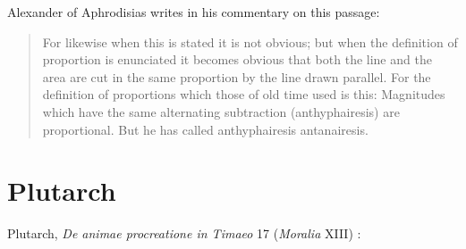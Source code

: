 \documentclass{article}
\theoremstyle{definition}
\begin{document}
Alexander of Aphrodisias \cite[p.~507]{thomasI} writes in his commentary on this passage:

\begin{quote}
For likewise when this is stated it is not obvious; but when the definition of proportion is enunciated it becomes obvious that both the line and the area are cut in the same proportion by the line drawn parallel. For the definition of proportions which those of old time used is this: Magnitudes which have the same alternating subtraction (anthyphairesis) are proportional. But he has called anthyphairesis antanairesis.
\end{quote}





\section{Plutarch}
Plutarch, {\em De animae procreatione in Timaeo} 17 ({\em Moralia} XIII) \cite[pp.~303--309]{chernissI}:
\end{document}
